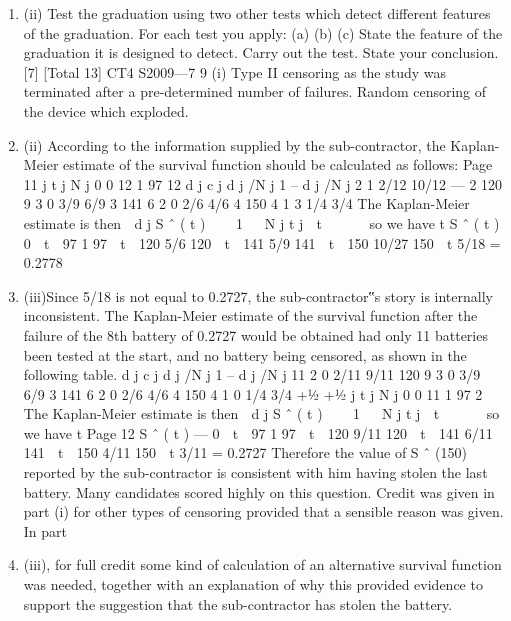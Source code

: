 \documentclass[a4paper,12pt]{article}
\begin{document}
\begin{enumerate}
[Total 11]
CT4 S2009—610
An investigation into the mortality of men engaged in a hazardous occupation was
carried out. The following is an extract from the results.
Age x Initial
exposed-to-risk E x
30
31
32
33
34
35
36
37
38 950
1,200
1,200
900
1,000
1,100
800
1,250
1,400
Observed
deaths θ x
12
14
16
9
11
15
10
16
17
q ˆ x
0.0126
0.0117
0.0133
0.0100
0.0110
0.0136
0.0125
0.0128
0.0121
It was decided to graduate the results with reference to English Life Table 15 (males).
o
The formula used for the graduation was q x = 10 q x s .
(i) Using a test of the overall fit of the graduated rates to the data, test the
hypothesis that the underlying mortality of men in the hazardous occupation is
in accordance with the graduation formula given above.
[6]
\item (ii) Test the graduation using two other tests which detect different features of the
graduation. For each test you apply:
(a)
(b)
(c)
State the feature of the graduation it is designed to detect.
Carry out the test.
State your conclusion.
[7]
[Total 13]
CT4 S2009—7
9
(i) Type II censoring as the study was terminated after a pre-determined number
of failures. Random censoring of the device which exploded.
\item (ii) According to the information supplied by the sub-contractor, the Kaplan-
Meier estimate of the survival function should be calculated as follows:
Page 11
j t j N j
0 0 12
1 97 12
d j c j d j /N j 1 – d j /N j
2 1 2/12 10/12  — %
2 120 9 3 0 3/9 6/9
3 141 6 2 0 2/6 4/6
4 150 4 1 3 1/4 3/4
The Kaplan-Meier estimate is then
 d j
S ˆ ( t )    1 
 N j
t j  t 




so we have
t S ˆ ( t )
0  t  97 1
97  t  120 5/6
120  t  141 5/9
141  t  150 10/27
150  t 5/18 = 0.2778
\item (iii)Since 5/18 is not equal to 0.2727, the sub-contractor‟s story is internally
inconsistent. The Kaplan-Meier estimate of the survival function after the
failure of the 8th battery of 0.2727 would be obtained had only 11 batteries
been tested at the start, and no battery being censored, as shown in the
following table.
d j c j d j /N j 1 – d j /N j
11 2 0 2/11 9/11
120 9 3 0 3/9 6/9
3 141 6 2 0 2/6 4/6
4 150 4 1 0 1/4 3/4
+1⁄2 +1⁄2
j t j N j
0 0 11
1 97 2
The Kaplan-Meier estimate is then
 d j
S ˆ ( t )    1 
 N j
t j  t 




so we have
t
Page 12
S ˆ ( t )  — %
0  t  97 1
97  t  120 9/11
120  t  141 6/11
141  t  150 4/11
150  t 3/11 = 0.2727
Therefore the value of S ˆ (150) reported by the sub-contractor is consistent with
him having stolen the last battery.
Many candidates scored highly on this question. Credit was given in part (i) for other
types of censoring provided that a sensible reason was given. In part \item (iii), for full
credit some kind of calculation of an alternative survival function was needed,
together with an explanation of why this provided evidence to support the suggestion
that the sub-contractor has stolen the battery.


\end{enumerate}
\end{document}

